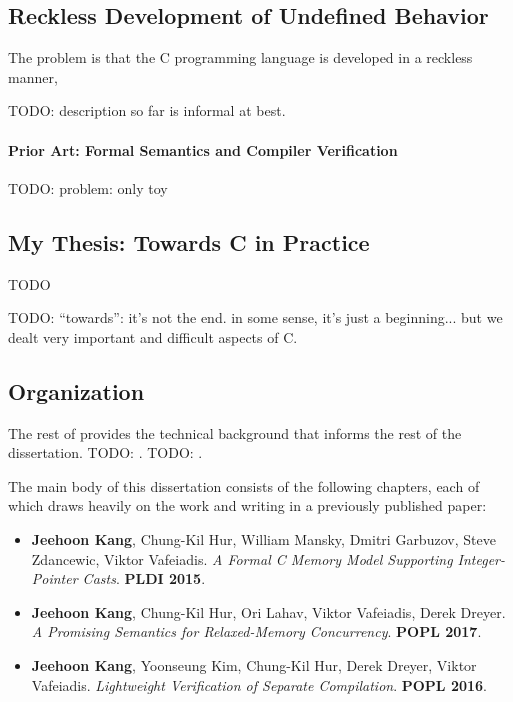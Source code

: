 \subsection{Reckless Development of Undefined Behavior}

The problem is that the C programming language is developed in a reckless manner,

TODO: description so far is informal at best.


\paragraph{Prior Art: Formal Semantics and Compiler Verification}

TODO: problem: only toy



\subsection{My Thesis: Towards C in Practice}

TODO

TODO: ``towards'': it's not the end.  in some sense, it's just a beginning...  but we dealt very
important and difficult aspects of C.


\subsection{Organization}

The rest of  provides the technical background that informs the rest of the
dissertation.  TODO: .  TODO: .

The main body of this dissertation consists of the following chapters, each of which draws heavily
on the work and writing in a previously published paper:

\begin{itemize}
\item {}

  \cite{intptrcast} \textbf{Jeehoon Kang}, Chung-Kil Hur, William Mansky, Dmitri Garbuzov,
  Steve Zdancewic, Viktor Vafeiadis.  \emph{A Formal C Memory Model Supporting Integer-Pointer
    Casts}.  \textbf{PLDI 2015}.  

\item {}

  \cite{promising} \textbf{Jeehoon Kang}, Chung-Kil Hur, Ori Lahav, Viktor Vafeiadis, Derek
  Dreyer.  \emph{A Promising Semantics for Relaxed-Memory Concurrency}.  \textbf{POPL 2017}.

\item {}

  \cite{sepcomp} \textbf{Jeehoon Kang}, Yoonseung Kim, Chung-Kil Hur, Derek Dreyer, Viktor
  Vafeiadis.  \emph{Lightweight Verification of Separate Compilation}.  \textbf{POPL 2016}.
\end{itemize}

